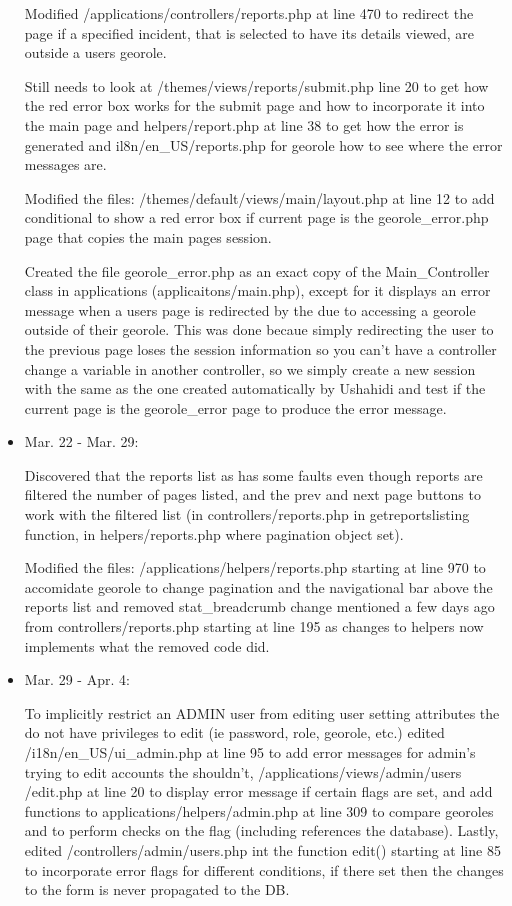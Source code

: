 \documentclass{article}
\begin{document}
\begin{itemize}
Modified /applications/controllers/reports.php at line 470 to redirect the page if a specified incident, that is selected to have its details viewed, are outside a users georole.
    
Still needs to look at /themes/views/reports/submit.php line 20 to get how the red error box works for the submit page and how to incorporate it into the main page and helpers/report.php at line 38 to get how the error is generated and il8n/en\_US/reports.php  for georole how to see where the error messages are.
        
Modified the files: /themes/default/views/main/layout.php at line 12 to add conditional to show a red error box if current page is the georole\_error.php page that copies the main pages session.
            
Created the file georole\_error.php as an exact copy of the Main\_Controller class in applications (applicaitons/main.php), except for it displays an error message when a users page is redirected by the due to accessing a georole outside of their georole. This was done becaue simply redirecting the user to the previous page loses the session information so you can't have a controller change a variable in another controller, so we simply create a new session with the same as the one created automatically by Ushahidi and test if the current page is the georole\_error page to produce the error message.

\item Mar. 22 - Mar. 29:

Discovered that the reports list as has some faults even though reports are filtered the number of pages listed, and the prev and next page buttons to work with the filtered list (in controllers/reports.php in getreportslisting function, in helpers/reports.php where pagination object set).
                     
Modified the files: /applications/helpers/reports.php starting at line 970 to accomidate georole to change pagination and the navigational bar above the reports list and removed stat\_breadcrumb change mentioned a few days ago from controllers/reports.php starting at line 195 as changes to helpers now implements what the removed code did.
                       
\item Mar. 29 - Apr. 4:

To implicitly restrict an ADMIN user from editing user setting attributes the do not have privileges to edit (ie password, role, georole, etc.) edited /i18n/en\_US/ui\_admin.php at line 95 to add error messages for admin's trying to edit accounts the shouldn't, /applications/views/admin/users
/edit.php at line 20 to display error message if certain flags are set, and add functions to applications/helpers/admin.php at line 309 to compare georoles and to perform checks on the flag (including references the database).  Lastly, edited /controllers/admin/users.php int the function edit() starting at line 85 to incorporate error flags for different conditions, if there set then the changes to the form is never propagated to the DB.
        

\end{itemize}
\end{document}
